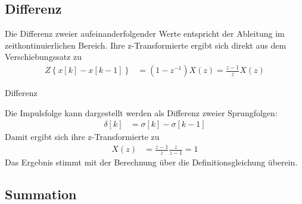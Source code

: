 \subsection{Differenz}\label{sec:differenz}

Die Differenz zweier aufeinanderfolgender Werte entspricht der Ableitung im zeitkontinuierlichen Bereich. Ihre z-Transformierte ergibt sich direkt aus dem Verschiebungssatz zu
\begin{align}
Z\left\{ x[ k] - x[ k - 1] \right\} &= \left( 1 - z^{- 1} \right)  X(z) = \frac{z - 1}{z}  X(z) \label{eq:5.58}
\end{align}
\begin{example}{Differenz}
\label{example:beispiel-differenz}

Die Impulsfolge kann dargestellt werden als Differenz zweier Sprungfolgen:
\begin{align*}
\delta[ k] &= \sigma[ k] - \sigma[ k - 1] 
\end{align*}
Damit ergibt sich ihre z-Transformierte zu
\begin{align*}
X(z) &= \frac{z - 1}{z}  \frac{z}{z - 1} = 1 
\end{align*}
Das Ergebnis stimmt mit der Berechnung über die Definitionsgleichung überein.

\end{example}

\subsection{Summation}\label{sec:summation}

